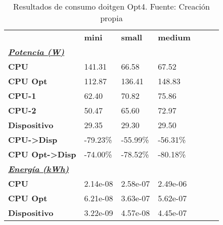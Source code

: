 \begin{table}[H]
    \centering
    \begin{tabular}{lllllll}
    \rowcolor[HTML]{DAE8FC} \ & \textbf{mini} & \textbf{	small} & \textbf{	medium} \\
    \cellcolor[HTML]{DAE8FC} \textbf{\textbf{{\emph{{\underline{{Potencia (W)}}}}}}} &  & 	 & 	 \\
    \rowcolor[HTML]{EFEFEF} \cellcolor[HTML]{DAE8FC} \textbf{CPU} & 141.31 & 	66.58 & 	67.52 \\
    \cellcolor[HTML]{DAE8FC} \textbf{CPU Opt} & 112.87 & 	136.41 & 	148.83 \\
    \rowcolor[HTML]{EFEFEF} \cellcolor[HTML]{DAE8FC} \textbf{\quad CPU-1} & 62.40 & 	70.82 & 	75.86 \\
    \cellcolor[HTML]{DAE8FC} \textbf{\quad CPU-2} & 50.47 & 	65.60 & 	72.97 \\
    \rowcolor[HTML]{EFEFEF} \cellcolor[HTML]{DAE8FC} \textbf{Dispositivo} & 29.35 & 	29.30 & 	29.50 \\
    \cellcolor[HTML]{DAE8FC} \textbf{CPU->Disp} & -79.23\% & 	-55.99\% & 	-56.31\% \\
    \rowcolor[HTML]{EFEFEF} \cellcolor[HTML]{DAE8FC} \textbf{CPU Opt->Disp} & -74.00\% & 	-78.52\% & 	-80.18\% \\
    \cellcolor[HTML]{DAE8FC} \textbf{\textbf{{\emph{{\underline{{Energía (kWh)}}}}}}} &  & 	 & 	 \\
    \rowcolor[HTML]{EFEFEF} \cellcolor[HTML]{DAE8FC} \textbf{CPU} & 2.14e-08 & 	2.58e-07 & 	2.49e-06 \\
    \cellcolor[HTML]{DAE8FC} \textbf{CPU Opt} & 6.21e-08 & 	3.63e-07 & 	5.62e-07 \\
    \rowcolor[HTML]{EFEFEF} \cellcolor[HTML]{DAE8FC} \textbf{Dispositivo} & 3.22e-09 & 	4.57e-08 & 	4.45e-07 \\
    \end{tabular}
    \caption[Resultados de consumo doitgen Opt4]{{Resultados de consumo doitgen Opt4. Fuente: Creación propia}}
    \label{table_test_doitgen_Opt4_hw_powerResults}
\end{table}